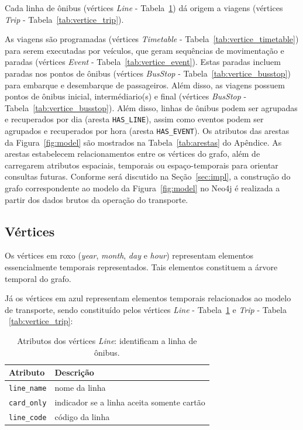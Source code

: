 Cada linha de ônibus (vértices \emph{Line} - Tabela~\ref{tab:vertice_line}) dá origem a viagens (vértices \emph{Trip} - Tabela~\ref{tab:vertice_trip}).

As viagens são programadas (vértices \emph{Timetable} - Tabela~\ref{tab:vertice_timetable}) para serem executadas por veículos, que geram sequências de movimentação e paradas (vértices \emph{Event} - Tabela~\ref{tab:vertice_event}). Estas paradas incluem paradas nos pontos de ônibus (vértices \emph{BusStop} - Tabela~\ref{tab:vertice_busstop}) para embarque e desembarque de passageiros. Além disso, as viagens possuem pontos de ônibus inicial, intermédiario(s) e final (vértices \emph{BusStop} - Tabela~\ref{tab:vertice_busstop}). Além disso, linhas de ônibus podem ser agrupadas e recuperados por dia (aresta \texttt{HAS\_LINE}), assim como eventos podem ser agrupados e recuperados por hora (aresta \texttt{HAS\_EVENT}). Os atributos das arestas da Figura~\ref{fig:model} são mostrados na Tabela~\ref{tab:arestas} do Apêndice. As arestas estabelecem relacionamentos entre os vértices do grafo, além de carregarem atributos espaciais, temporais ou espaço-temporais para orientar consultas futuras.
Conforme será discutido na Seção~\ref{sec:impl}, a construção do grafo correspondente ao modelo da Figura~\ref{fig:model} no Neo4j é realizada a partir dos dados brutos da operação do transporte.


\subsection{Vértices}

Os vértices em roxo (\emph{year}, \emph{month}, \emph{day} e \emph{hour}) representam elementos essencialmente temporais representados. Tais elementos constituem a árvore temporal do grafo.

Já os vértices em azul representam elementos temporais relacionados ao modelo de transporte, sendo constituído pelos vértices \emph{Line} - Tabela~\ref{tab:vertice_line} e \emph{Trip} - Tabela ~\ref{tab:vertice_trip}:
 
\begin{table}[!htb]
    \caption{Atributos dos vértices \emph{Line}: identificam a linha de ônibus.}
    \label{tab:vertice_line}
    \centering
    \footnotesize
    \begin{tabular}{p{2.5cm}p{6cm}} 
    \hline
    Atributo & Descrição\\
    \hline
    \texttt{line\_name}        & nome da linha \\
    \texttt{card\_only}        & indicador se a linha aceita somente cartão \\
    \texttt{line\_code}        & código da linha \\
    \hline
    \end{tabular}
\end{table}


